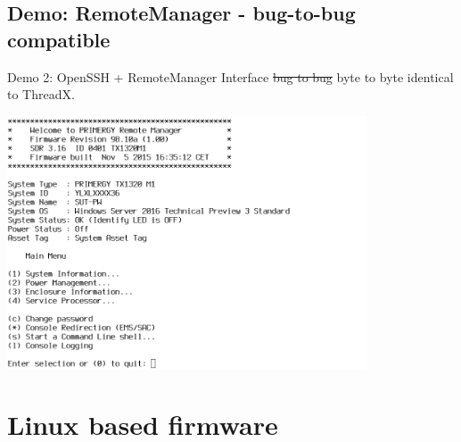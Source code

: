 \documentclass{beamer}
\begin{document}
  \subsection{Demo: RemoteManager - bug-to-bug compatible}
  \begin{frame}{Demo 2: OpenSSH + RemoteManager}
	  \alert{Interface \st{bug to bug} byte to byte identical to ThreadX}.

	  \begin{center}
		  \includegraphics[width=0.8\textwidth]{screenshot/remote-manager.png}
	  \end{center}

  \end{frame}

\section{Linux based firmware}
\end{document}
